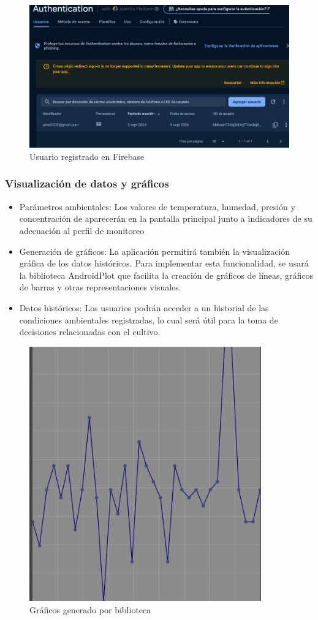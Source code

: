 \documentclass[../main]{subfiles}
\begin{document}
\begin{figure}[H]
	\centering
	\includegraphics[width=15cm]{res/AutenticacionFireBase.png}
	\caption{Usuario registrado en Firebase}
	\label{FiguraDeAutenticacion}
\end{figure}

\subsubsection{Visualización de datos y gráficos}

\begin{itemize}
	\item Parámetros ambientales:
	      Los valores de temperatura, humedad, presión y concentración de 
	      aparecerán en la pantalla principal junto a indicadores de su
	      adecuación al perfil de monitoreo
	\item Generación de gráficos:
	      La aplicación permitirá también la visualización gráfica de los datos
	      históricos. Para implementar esta funcionalidad, se usará la biblioteca
	      AndroidPlot que facilita la creación de gráficos de líneas, gráficos de
	      barras y otras representaciones visuales.
	\item Datos históricos:
	      Los usuarios podrán acceder a un historial de las condiciones ambientales
	      registradas, lo cual será útil para la toma de decisiones relacionadas
	      con el cultivo.
\end{itemize}

\begin{figure}[H]
	\centering
	\includegraphics[width=10cm]{res/GráficosParaAplicación.jpeg}
	\caption{Gráficos generado por biblioteca}
	\label{FiguraDeGráficos}
\end{figure}
\end{document}
